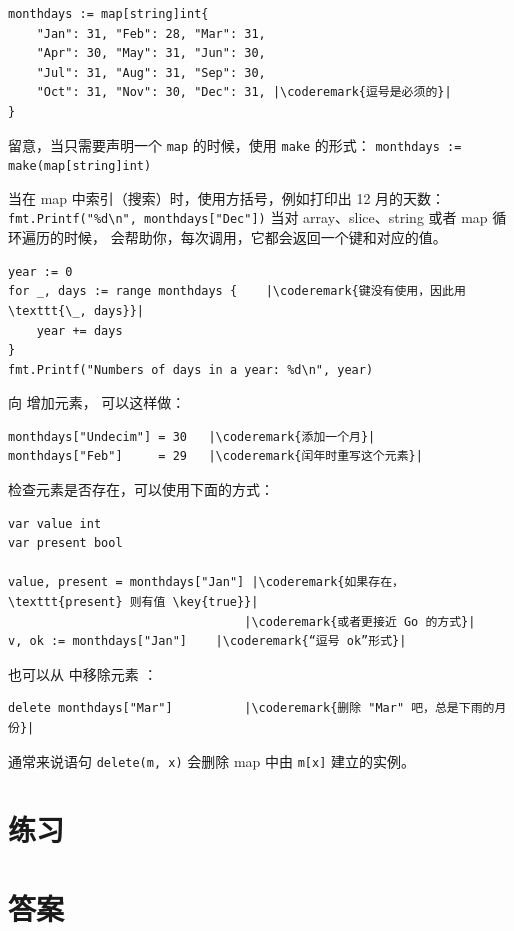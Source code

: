 \begin{lstlisting}
monthdays := map[string]int{
	"Jan": 31, "Feb": 28, "Mar": 31, 
	"Apr": 30, "May": 31, "Jun": 30, 
	"Jul": 31, "Aug": 31, "Sep": 30, 
	"Oct": 31, "Nov": 30, "Dec": 31, |\coderemark{逗号是必须的}|
}		    
\end{lstlisting}
留意，当只需要声明一个 \lstinline{map} 的时候，使用 \lstinline{make} 的形式：
\lstinline|monthdays := make(map[string]int)|

当在 map 中索引（搜索）时，使用方括号，例如打印出 12 月的天数：
\lstinline{fmt.Printf("%d\n", monthdays["Dec"])}\newline
当对 array、slice、string 或者 map 循环遍历的时候，
会帮助你，每次调用，它都会返回一个键和对应的值。
\begin{lstlisting}
year := 0
for _, days := range monthdays {    |\coderemark{键没有使用，因此用 \texttt{\_, days}}|
    year += days
}
fmt.Printf("Numbers of days in a year: %d\n", year)
\end{lstlisting}
向  增加元素， 可以这样做：
\begin{lstlisting}
monthdays["Undecim"] = 30	|\coderemark{添加一个月}|
monthdays["Feb"]     = 29	|\coderemark{闰年时重写这个元素}|
\end{lstlisting}
检查元素是否存在，可以使用下面的方式\cite{go_course_day2}：
\begin{lstlisting}
var value int
var present bool

value, present = monthdays["Jan"] |\coderemark{如果存在，\texttt{present} 则有值 \key{true}}|
                                 |\coderemark{或者更接近 Go 的方式}|
v, ok := monthdays["Jan"]	 |\coderemark{“逗号 ok”形式}|
\end{lstlisting}
也可以从  中移除元素 ：
\begin{lstlisting}
delete monthdays["Mar"]          |\coderemark{删除 "Mar" 吧，总是下雨的月份}|
\end{lstlisting}
通常来说语句 \lstinline{delete(m, x)} 会删除 map 中由 \lstinline{m[x]} 建立的实例。

\section{练习}








\cleardoublepage
\section{答案}
\shipoutAnswer
